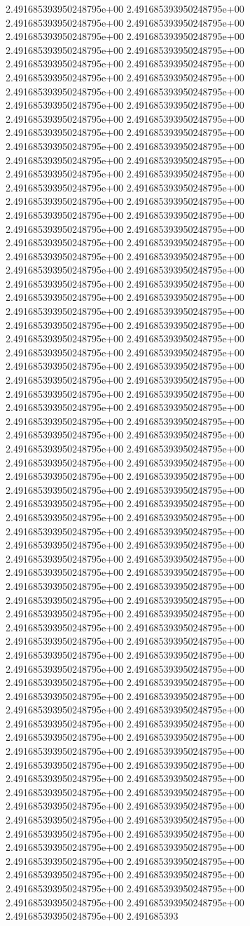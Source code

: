 2.491685393950248795e+00	2.491685393950248795e+00	2.491685393950248795e+00	2.491685393950248795e+00	2.491685393950248795e+00	2.491685393950248795e+00	2.491685393950248795e+00	2.491685393950248795e+00	2.491685393950248795e+00	2.491685393950248795e+00	2.491685393950248795e+00	2.491685393950248795e+00	2.491685393950248795e+00	2.491685393950248795e+00	2.491685393950248795e+00	2.491685393950248795e+00	2.491685393950248795e+00	2.491685393950248795e+00	2.491685393950248795e+00	2.491685393950248795e+00	2.491685393950248795e+00	2.491685393950248795e+00	2.491685393950248795e+00	2.491685393950248795e+00	2.491685393950248795e+00	2.491685393950248795e+00	2.491685393950248795e+00	2.491685393950248795e+00	2.491685393950248795e+00	2.491685393950248795e+00	2.491685393950248795e+00	2.491685393950248795e+00	2.491685393950248795e+00	2.491685393950248795e+00	2.491685393950248795e+00	2.491685393950248795e+00	2.491685393950248795e+00	2.491685393950248795e+00	2.491685393950248795e+00	2.491685393950248795e+00	2.491685393950248795e+00	2.491685393950248795e+00	2.491685393950248795e+00	2.491685393950248795e+00	2.491685393950248795e+00	2.491685393950248795e+00	2.491685393950248795e+00	2.491685393950248795e+00	2.491685393950248795e+00	2.491685393950248795e+00	2.491685393950248795e+00	2.491685393950248795e+00	2.491685393950248795e+00	2.491685393950248795e+00	2.491685393950248795e+00	2.491685393950248795e+00	2.491685393950248795e+00	2.491685393950248795e+00	2.491685393950248795e+00	2.491685393950248795e+00	2.491685393950248795e+00	2.491685393950248795e+00	2.491685393950248795e+00	2.491685393950248795e+00	2.491685393950248795e+00	2.491685393950248795e+00	2.491685393950248795e+00	2.491685393950248795e+00	2.491685393950248795e+00	2.491685393950248795e+00	2.491685393950248795e+00	2.491685393950248795e+00	2.491685393950248795e+00	2.491685393950248795e+00	2.491685393950248795e+00	2.491685393950248795e+00	2.491685393950248795e+00	2.491685393950248795e+00	2.491685393950248795e+00	2.491685393950248795e+00	2.491685393950248795e+00	2.491685393950248795e+00	2.491685393950248795e+00	2.491685393950248795e+00	2.491685393950248795e+00	2.491685393950248795e+00	2.491685393950248795e+00	2.491685393950248795e+00	2.491685393950248795e+00	2.491685393950248795e+00	2.491685393950248795e+00	2.491685393950248795e+00	2.491685393950248795e+00	2.491685393950248795e+00	2.491685393950248795e+00	2.491685393950248795e+00	2.491685393950248795e+00	2.491685393950248795e+00	2.491685393950248795e+00	2.491685393950248795e+00	2.491685393950248795e+00	2.491685393950248795e+00	2.491685393950248795e+00	2.491685393950248795e+00	2.491685393950248795e+00	2.491685393950248795e+00	2.491685393950248795e+00	2.491685393950248795e+00	2.491685393950248795e+00	2.491685393950248795e+00	2.491685393950248795e+00	2.491685393950248795e+00	2.491685393950248795e+00	2.491685393950248795e+00	2.491685393950248795e+00	2.491685393950248795e+00	2.491685393950248795e+00	2.491685393950248795e+00	2.491685393950248795e+00	2.491685393950248795e+00	2.491685393950248795e+00	2.491685393950248795e+00	2.491685393950248795e+00	2.491685393950248795e+00	2.491685393950248795e+00	2.491685393950248795e+00	2.491685393950248795e+00	2.491685393950248795e+00	2.491685393950248795e+00	2.491685393950248795e+00	2.491685393950248795e+00	2.491685393950248795e+00	2.491685393950248795e+00	2.491685393
